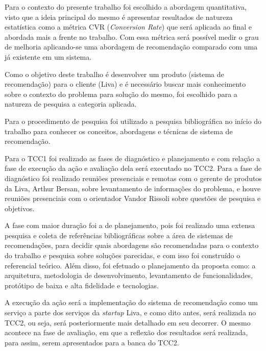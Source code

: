 Para o contexto do presente trabalho foi escolhido a abordagem quantitativa, visto que a ideia principal do mesmo é apresentar resultados de natureza estatística como a métrica CVR (\textit{Conversion Rate}) que será aplicada ao final e abordada mais a frente no trabalho. Com essa métrica será possível medir o grau de melhoria aplicando-se uma abordagem de recomendação comparado com uma já existente em um sistema.

Como o objetivo deste trabalho é desenvolver um produto (sistema de recomendação) para o cliente (Liva) e é necessário buscar mais conhecimento sobre o contexto do problema para solução do mesmo, foi escolhido para a natureza de pesquisa a categoria aplicada.

Para o procedimento de pesquisa foi utilizado a pesquisa bibliográfica no início do trabalho para conhecer os conceitos, abordagens e técnicas de sistema de recomendação.

Para o TCC1 foi realizado as fases de diagnóstico e planejamento e com relação a fase de execução da ação e avaliação dela será executado no TCC2. Para a fase de diagnóstico foi realizado reuniões presenciais e remotas com o gerente de produtos da Liva, Arthur Bersan, sobre levantamento de informações do problema, e houve reuniões presenciais com o orientador Vandor Rissoli sobre questões de pesquisa e objetivos.

A fase com maior duração foi a de planejamento, pois foi realizado uma extensa pesquisa e coleta de referências bibliográficas sobre a área de sistemas de recomendações, para decidir quais abordagens são recomendadas para o contexto do trabalho e pesquisa sobre soluções parecidas, e com isso foi construído o referencial teórico. Além disso, foi efetuado o planejamento da proposta como: a arquitetura, metodologia de desenvolvimento, levantamento de funcionalidades, protótipo de baixa e alta fidelidade e tecnologias.

A execução da ação será a implementação do sistema de recomendação como um serviço a parte dos serviços da \textit{startup} Liva, e como dito antes, será realizada no TCC2, ou seja, será posteriormente mais detalhado em seu decorrer. O mesmo acontece na fase de avaliação, em que a reflexão dos resultados será realizada, para assim, serem apresentados para a banca do TCC2.

